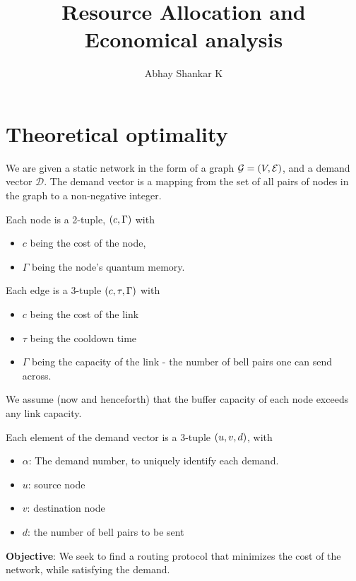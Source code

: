 \documentclass{amsart}
\begin{document}
    \title{Resource Allocation and Economical analysis}
    \author{Abhay Shankar K}
    \maketitle

    \section{Theoretical optimality}

    We are given a static network in the form of a graph \(\mathcal{G} = \left(V, \mathcal{E}\right)\), and a demand vector \(\mathcal{D}\). The demand vector is a mapping from the set of all pairs of nodes in the graph to a non-negative integer. 


    Each node is a 2-tuple, \(\left(c, \Gamma\right)\) with \begin{itemize}
        \item \(c\) being the cost of the node,
        \item \(\Gamma\) being the node's quantum memory.
    \end{itemize}


    Each edge is a 3-tuple \(\left(c, \tau, \Gamma\right)\) with \begin{itemize}
        \item \(c\) being the cost of the link
        \item \(\tau\) being the cooldown time
        \item \(\Gamma\) being the capacity of the link - the number of bell pairs one can send across.
    \end{itemize}

    We assume (now and henceforth) that the buffer capacity of each node exceeds any link capacity.

    Each element of the demand vector is a 3-tuple \(\left(u, v, d\right)\), with \begin{itemize}
        \item \(\alpha\): The demand number, to uniquely identify each demand.
        \item \(u\): source node
        \item \(v\): destination node
        \item \(d\): the number of bell pairs to be sent
    \end{itemize}

    \textbf{Objective}:
    We seek to find a routing protocol that minimizes the cost of the network, while satisfying the demand. 
\end{document}

